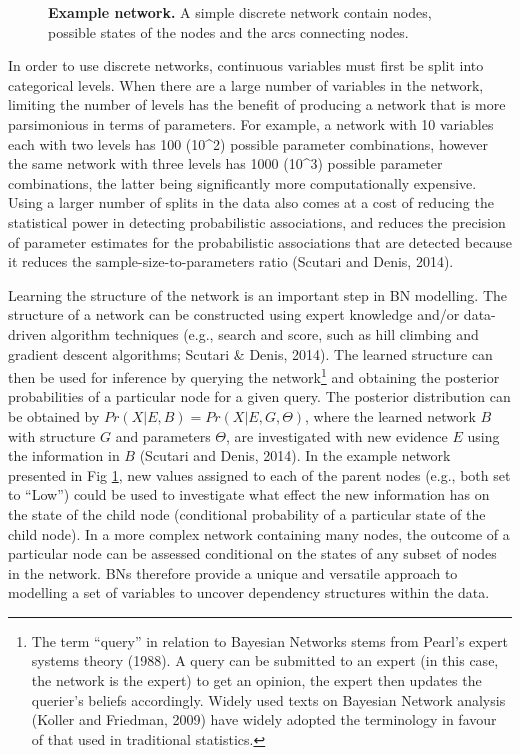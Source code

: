 \documentclass[utf8]{frontiersHLTH}
\begin{document}
\begin{figure}[H]
\caption{{\bf Example network.}
A simple discrete network contain nodes, possible states of the nodes and the arcs connecting nodes.}
\label{fig:fig5}
\end{figure}

In order to use discrete networks, continuous variables must first be
split into categorical levels. When there are a large number of
variables in the network, limiting the number of levels has the benefit
of producing a network that is more parsimonious in terms of parameters.
For example, a network with 10 variables each with two levels has 100
(10\^{}2) possible parameter combinations, however the same network with
three levels has 1000 (10\^{}3) possible parameter combinations, the
latter being significantly more computationally expensive. Using a
larger number of splits in the data also comes at a cost of reducing the
statistical power in detecting probabilistic associations, and reduces
the precision of parameter estimates for the probabilistic associations
that are detected because it reduces the sample-size-to-parameters ratio
(Scutari and Denis, 2014).

Learning the structure of the network is an important step in BN
modelling. The structure of a network can be constructed using expert
knowledge and/or data-driven algorithm techniques (e.g., search and
score, such as hill climbing and gradient descent algorithms; Scutari \&
Denis, 2014). The learned structure can then be used for inference by
querying the network\footnote{The term ``query'' in relation to Bayesian
  Networks stems from Pearl's expert systems theory (1988). A query can
  be submitted to an expert (in this case, the network is the expert) to
  get an opinion, the expert then updates the querier's beliefs
  accordingly. Widely used texts on Bayesian Network analysis (Koller
  and Friedman, 2009) have widely adopted the terminology in favour of
  that used in traditional statistics.} and obtaining the posterior
probabilities of a particular node for a given query. The posterior
distribution can be obtained by \(Pr(X|E,B) = Pr(X|E,G,\Theta)\), where
the learned network \(B\) with structure \(G\) and parameters
\(\Theta\), are investigated with new evidence \(E\) using the
information in \(B\) (Scutari and Denis, 2014). In the example network
presented in Fig \ref{fig:fig5}, new values assigned to each of the
parent nodes (e.g., both set to ``Low'') could be used to investigate
what effect the new information has on the state of the child node
(conditional probability of a particular state of the child node). In a
more complex network containing many nodes, the outcome of a particular
node can be assessed conditional on the states of any subset of nodes in
the network. BNs therefore provide a unique and versatile approach to
modelling a set of variables to uncover dependency structures within the
data.
\end{document}
